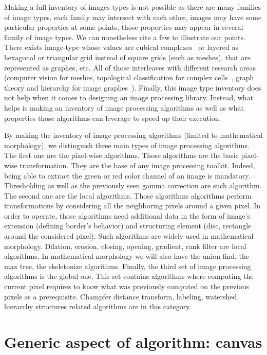 Making a full inventory of images types is not possible as there are many families of image types, each family may
intersect with each other, images may have some particular properties at some points, those properties may appear in
several family of image types. We can nonetheless cite a few to illustrate our points. There exists image-type whose
values are cubical complexes~\parencite{ziou.2002.cubical-complex} or layered as hexagonal or triangular grid instead of
square grids (such as meshes), that are represented as graphes, etc. All of those interleaves with different research
areas (computer vision for meshes, topological classification for complex
cells~\parencite{movn.20.cviu,allili.2001.cubical}, graph theory and hierarchy for image
graphes~\parencite{carlinet.2014.tip,carlinet.2015.tip,perret.2019.higra}). Finally, this image type inventory does not
help when it comes to designing an image processing library. Instead, what helps is making an inventory of image
processing algorithms as well as what properties those algorithms can leverage to speed up their execution.

By making the inventory of image processing algorithms (limited to mathematical morphology), we distinguish three main
types of image processing algorithms. The first one are the pixel-wise algorithms. Those algorithms are the basic
pixel-wise transformation. They are the base of any image processing toolkit. Indeed, being able to extract the green or
red color channel of an image is mandatory. Thresholding as well as the previously seen gamma correction are such
algorithm. The second one are the local algorithms. Those algorithms algorithms perform transformations by considering
all the neighboring pixels around a given pixel. In order to operate, those algorithms need additional data in the form
of image's extension (defining border's behavior) and structuring element (disc, rectangle around the considered pixel).
Such algorithms are widely used in mathematical morphology. Dilation, erosion, closing, opening, gradient, rank filter
are local algorithms. In mathematical morphology we will also have the union find, the max tree, the skeletonize
algorithms. Finally, the third set of image processing algorithms is the global one. This set contains algorithms where
computing the current pixel requires to know what was previously computed on the previous pixels as a prerequisite.
Champfer distance transform, labeling, watershed, hierarchy structures related algorithms are in this category.


\section{Generic aspect of algorithm: canvas}
\label{sec:canvas}


